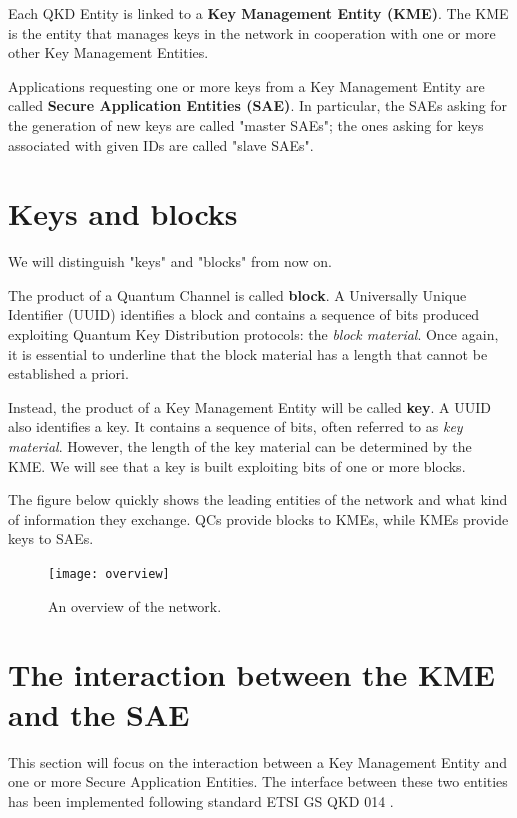 Each QKD Entity is linked to a \textbf{Key Management Entity (KME)}. The KME is the entity that manages keys in the network in cooperation with one or more other Key Management Entities.

Applications requesting one or more keys from a Key Management Entity are called \textbf{Secure Application Entities (SAE)}. In particular, the SAEs asking for the generation of new keys are called "master SAEs"; the ones asking for keys associated with given IDs are called "slave SAEs".

\section{Keys and blocks}
\label{kme:keys_vs_blocks}

We will distinguish "keys" and "blocks" from now on.

The product of a Quantum Channel is called \textbf{block}. A Universally Unique Identifier (UUID) \cite{uuid} identifies a block and contains a sequence of bits produced exploiting Quantum Key Distribution protocols: the \textit{block material}. Once again, it is essential to underline that the block material has a length that cannot be established a priori.

Instead, the product of a Key Management Entity will be called \textbf{key}. A UUID also identifies a key. It contains a sequence of bits, often referred to as \textit{key material}. However, the length of the key material can be determined by the KME. We will see that a key is built exploiting bits of one or more blocks.

The figure below quickly shows the leading entities of the network and what kind of information they exchange. QCs provide blocks to KMEs, while KMEs provide keys to SAEs.

\begin{figure}[H]
    \centering
    \texttt{[image: overview]}
    \caption{An overview of the network.}
    \label{fig:overview}
\end{figure}

\section{The interaction between the KME and the SAE}
This section will focus on the interaction between a Key Management Entity and one or more Secure Application Entities. The interface between these two entities has been implemented following standard ETSI GS QKD 014 \cite{etsi014}.


